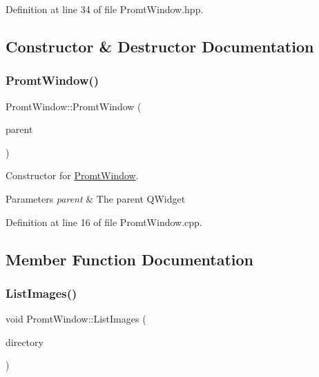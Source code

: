 Definition at line 34 of file Promt\+Window.\+hpp.



\subsection{Constructor \& Destructor Documentation}
\mbox{\label{classPromtWindow_a6536787a099e6d7348db00b4382244a8}} 
\subsubsection{\texorpdfstring{Promt\+Window()}{PromtWindow()}}
{\footnotesize\ttfamily Promt\+Window\+::\+Promt\+Window (\begin{DoxyParamCaption}\item[{Q\+Widget $\ast$}]{parent }\end{DoxyParamCaption})}



Constructor for \mbox{\hyperlink{classPromtWindow}{Promt\+Window}}. 


\begin{DoxyParams}{Parameters}
{\em parent} & The parent Q\+Widget \\
\hline
\end{DoxyParams}


Definition at line 16 of file Promt\+Window.\+cpp.



\subsection{Member Function Documentation}
\mbox{\label{classPromtWindow_a9f2e84ed19a4f520e0e764c31cc39362}} 
\subsubsection{\texorpdfstring{List\+Images()}{ListImages()}}
{\footnotesize\ttfamily void Promt\+Window\+::\+List\+Images (\begin{DoxyParamCaption}\item[{Q\+Dir}]{directory }\end{DoxyParamCaption})}



